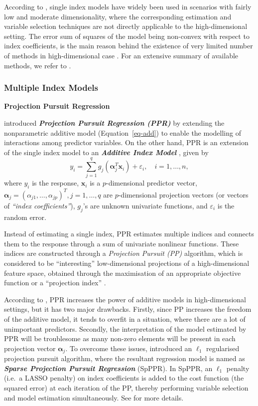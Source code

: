 \documentclass[11pt,a4paper,]{article}
\begin{document}
According to \textcite{Radchenko2015}, single index models have widely
been used in scenarios with fairly low and moderate dimensionality,
where the corresponding estimation and variable selection techniques are
not directly applicable to the high-dimensional setting. The error sum
of squares of the model being non-convex with respect to index
coefficients, is the main reason behind the existence of very limited
number of methods in high-dimensional case \autocite{Radchenko2015}. For
an extensive summary of available methods, we refer to
\textcite{Radchenko2015}.

\hypertarget{sec-multi-index}{%
\subsubsection{Multiple Index Models}\label{sec-multi-index}}

\textbf{Projection Pursuit Regression}

\textcite{Friedman1981} introduced \textbf{\emph{Projection Pursuit
Regression (PPR)}} by extending the nonparametric additive model
(Equation~\ref{eq-add}) to enable the modelling of interactions among
predictor variables. On the other hand, PPR is an extension of the
single index model to an \textbf{\emph{Additive Index Model }}, given by
\[
  y_{i} = \sum_{j=1}^{q} {g_{j}(\bm{\alpha}_{j}^{T}\bm{x}_{i})} + \varepsilon_{i}, \quad i = 1, \dots, n,
\] where \(y_{i}\) is the response, \(\bm{x}_{i}\) is a
\(p\)-dimensional predictor vector,
\(\bm{\alpha}_{j} = \left ( \alpha_{j1}, \dots, \alpha_{jp} \right )^{T}, j = 1, \dots, q\)
are \(p\)-dimensional projection vectors (or vectors of \emph{``index
coefficients''}), \(g_{j}\)'s are unknown univariate functions, and
\(\varepsilon_{i}\) is the random error.

Instead of estimating a single index, PPR estimates multiple indices and
connects them to the response through a sum of univariate nonlinear
functions. These indices are constructed through a \emph{Projection
Pursuit (PP)} \autocite{Kruskal1969,Friedman1974} algorithm, which is
considered to be ``interesting'' low-dimensional projections of a
high-dimensional feature space, obtained through the maximisation of an
appropriate objective function or a ``projection index''
\autocite{Huber1985}.

According to \textcite{Zhang2008}, PPR increases the power of additive
models in high-dimensional settings, but it has two major drawbacks.
Firstly, since PP increases the freedom of the additive model, it tends
to overfit in a situation, where there are a lot of unimportant
predictors. Secondly, the interpretation of the model estimated by PPR
will be troublesome as many non-zero elements will be present in each
projection vector \(\bm{\alpha}_{j}\). To overcome these issues,
\textcite{Zhang2008} introduced an \(\ell_{1}\) regularised projection
pursuit algorithm, where the resultant regression model is named as
\textbf{\emph{Sparse Projection Pursuit Regression}} (SpPPR). In SpPPR,
an \(\ell_{1}\) penalty (i.e.~a LASSO penalty) on index coefficients is
added to the cost function (the squared error) at each iteration of the
PP, thereby performing variable selection and model estimation
simultaneously. See \textcite{Zhang2008} for more details.
\end{document}
